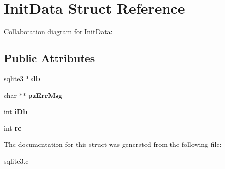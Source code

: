 \hypertarget{structInitData}{}\section{Init\+Data Struct Reference}
\label{structInitData}


Collaboration diagram for Init\+Data\+:
\subsection*{Public Attributes}
\begin{DoxyCompactItemize}
\item 
\hyperlink{structsqlite3}{sqlite3} $\ast$ {\bfseries db}\hypertarget{structInitData_adc9e29c56e0392076e92d7f4b29fa272}{}\label{structInitData_adc9e29c56e0392076e92d7f4b29fa272}

\item 
char $\ast$$\ast$ {\bfseries pz\+Err\+Msg}\hypertarget{structInitData_aa8aef34241ec214f038b38932ffe1357}{}\label{structInitData_aa8aef34241ec214f038b38932ffe1357}

\item 
int {\bfseries i\+Db}\hypertarget{structInitData_ad6c7953b49d351cd9fb14e3394010689}{}\label{structInitData_ad6c7953b49d351cd9fb14e3394010689}

\item 
int {\bfseries rc}\hypertarget{structInitData_a627153a3de2c4d159ae44ebc03961592}{}\label{structInitData_a627153a3de2c4d159ae44ebc03961592}

\end{DoxyCompactItemize}


The documentation for this struct was generated from the following file\+:\begin{DoxyCompactItemize}
\item 
sqlite3.\+c\end{DoxyCompactItemize}
